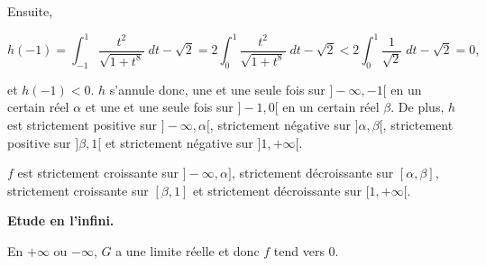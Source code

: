 {{Ensuite, 

$$h(-1)=\int_{-1}^{1}\frac{t^2}{\sqrt{1+t^8}}\;dt-\sqrt{2}=2\int_{0}^{1}\frac{t^2}{\sqrt{1+t^8}}\;dt-\sqrt{2}<2\int_{0}^{1}\frac{1}{\sqrt{2}}\;dt-\sqrt{2}=0,$$

et $h(-1)<0$. $h$ s'annule donc, une et une seule fois sur $]-\infty,-1[$ en un certain réel $\alpha$ et une et une seule fois sur $]-1,0[$ en un certain réel $\beta$. De plus, $h$ est strictement positive sur $]-\infty,\alpha[$, strictement négative sur $]\alpha,\beta[$, strictement positive sur $]\beta,1[$ et strictement négative sur $]1,+\infty[$.

$f$ est strictement croissante sur $]-\infty,\alpha]$, strictement décroissante sur $[\alpha,\beta]$, strictement croissante sur $[\beta,1]$ et strictement décroissante sur $[1,+\infty[$.

\textbf{Etude en l'infini.}

En $+\infty$ ou $-\infty$, $G$ a une limite réelle et donc $f$ tend vers $0$.}
}